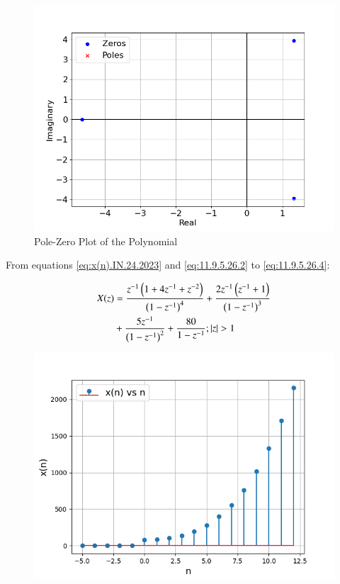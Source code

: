 \documentclass[journal,12pt,twocolumn]{IEEEtran}
\theoremstyle{remark}
\begin{document}

\begin{figure}[htbp]
    \centering
    \includegraphics[width = \columnwidth]{figs/poles and root_plot.png}
  \caption{Pole-Zero Plot of the Polynomial}
    \label{fig:graph1}
\end{figure}

\noindent From equations \eqref{eq:x(n).IN.24.2023} and \eqref{eq:11.9.5.26.2} to \eqref{eq:11.9.5.26.4}:

\begin{align}
    X(z) &= \frac{z^{-1}\brak{1+4z^{-1}+z^{-2}}}{\brak{1-z^{-1}}^4} + \frac{2z^{-1}\brak{z^{-1}+1}}{\brak{1-z^{-1}}^3} \notag \\
    &+\frac{5z^{-1}}{\brak{1-z^{-1}}^2}+\dfrac{80}{1-z^{-1}} ; |z|>1
\end{align}

\begin{figure}[htbp]
    \centering
    \includegraphics[width = \columnwidth]{figs/x_n_plot.png}
  \caption{}
    \label{fig:graph1.IN.24.2023}
\end{figure}
\end{document}
